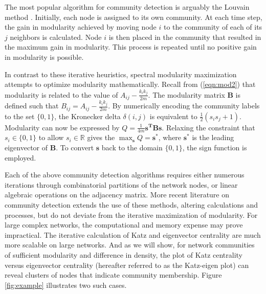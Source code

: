 \documentclass{IEEEtran}
\begin{document}
	The most popular algorithm for community detection is arguably the Louvain method \cite{louvain}. Initially, each node is assigned to its own community. At each time step, the gain in modularity achieved by moving node $i$ to the community of each of its $j$ neighbors is calculated. Node $i$ is then placed in the community that resulted in the maximum gain in modularity. This process is repeated until no positive gain in modularity is possible.
	
	In contrast to these iterative heuristics, spectral modularity maximization attempts to optimize modularity mathematically\cite{spectral}. Recall from (\ref{eqn:mod2}) that modularity is related to the value of $A_{ij} - \frac{k_ik_j}{2m}$. The modularity matrix $\mathbf{B}$ is defined such that $B_{ij} =A_{ij} - \frac{k_ik_j}{2m}$. By numerically encoding the community labels to the set $\{0,1\}$, the Kronecker delta $\delta(i,j)$ is equivalent to $\frac{1}{2}(s_is_j + 1)$. Modularity can now be expressed by $Q = \frac{1}{4m}\mathbf{s^T}\mathbf{B}\mathbf{s}$. Relaxing the constraint that $s_i\in\{0,1\}$ to allow $s_i\in \mathbb{R}$ gives the $\max_{\mathbf{s}}Q = \mathbf{s^*}$, where $\mathbf{s^*}$ is the leading eigenvector of $\mathbf{B}$. To convert $\mathbf{s}$ back to the domain $\{0,1\}$, the sign function is employed.
	
	Each of the above community detection algorithms requires either numerous iterations through combinatorial partitions of the network nodes, or linear algebraic operations on the adjacency matrix. More recent literature on community detection extends the use of these methods, altering calculations and processes, but do not deviate from the iterative maximization of modularity\cite{Leider,alpha}. For large complex networks, the computational and memory expense may prove impractical. The iterative calculation of Katz and eigenvector centrality are much more scalable on large networks. And as we will show, for network communities of sufficient modularity and difference in density, the plot of Katz centrality versus eigenvector centrality (hereafter referred to as the Katz-eigen plot) can reveal clusters of nodes that indicate community membership. Figure \ref{fig:example} illustrates two such cases.
	
\end{document}
